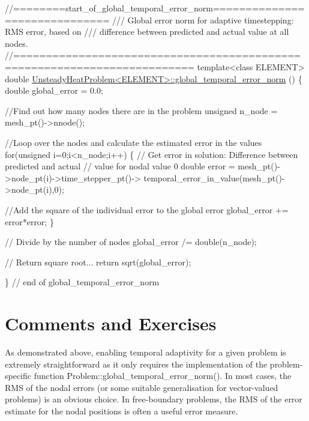  
\begin{DoxyCodeInclude}
\textcolor{comment}{//========start\_of\_global\_temporal\_error\_norm==============================}
\textcolor{comment}{/// Global error norm for adaptive timestepping: RMS error, based on}
\textcolor{comment}{}\textcolor{comment}{/// difference between predicted and actual value at all nodes.}
\textcolor{comment}{}\textcolor{comment}{//=========================================================================}
\textcolor{keyword}{template}<\textcolor{keyword}{class} ELEMENT>
\textcolor{keywordtype}{double} \hyperlink{classUnsteadyHeatProblem_a888e25dd97e89d31e485cb188721dbe1}{UnsteadyHeatProblem<ELEMENT>::global\_temporal\_error\_norm}
      ()
\{
 \textcolor{keywordtype}{double} global\_error = 0.0;
   
 \textcolor{comment}{//Find out how many nodes there are in the problem}
 \textcolor{keywordtype}{unsigned} n\_node = mesh\_pt()->nnode();

 \textcolor{comment}{//Loop over the nodes and calculate the estimated error in the values}
 \textcolor{keywordflow}{for}(\textcolor{keywordtype}{unsigned} i=0;i<n\_node;i++)
  \{
   \textcolor{comment}{// Get error in solution: Difference between predicted and actual}
   \textcolor{comment}{// value for nodal value 0}
   \textcolor{keywordtype}{double} error = mesh\_pt()->node\_pt(i)->time\_stepper\_pt()->
    temporal\_error\_in\_value(mesh\_pt()->node\_pt(i),0);
   
   \textcolor{comment}{//Add the square of the individual error to the global error}
   global\_error += error*error;
  \}
    
 \textcolor{comment}{// Divide by the number of nodes}
 global\_error /= double(n\_node);

 \textcolor{comment}{// Return square root...}
 \textcolor{keywordflow}{return} sqrt(global\_error);

\} \textcolor{comment}{// end of global\_temporal\_error\_norm}

\end{DoxyCodeInclude}




 

\hypertarget{index_comments}{}\section{Comments and Exercises}\label{index_comments}
As demonstrated above, enabling temporal adaptivity for a given problem is extremely straightforward as it only requires the implementation of the problem-\/specific function {\ttfamily Problem\+::global\+\_\+temporal\+\_\+error\+\_\+norm()}. In most cases, the R\+MS of the nodal errors (or some suitable generalisation for vector-\/valued problems) is an obvious choice. In free-\/boundary problems, the R\+MS of the error estimate for the nodal positions is often a useful error measure.



